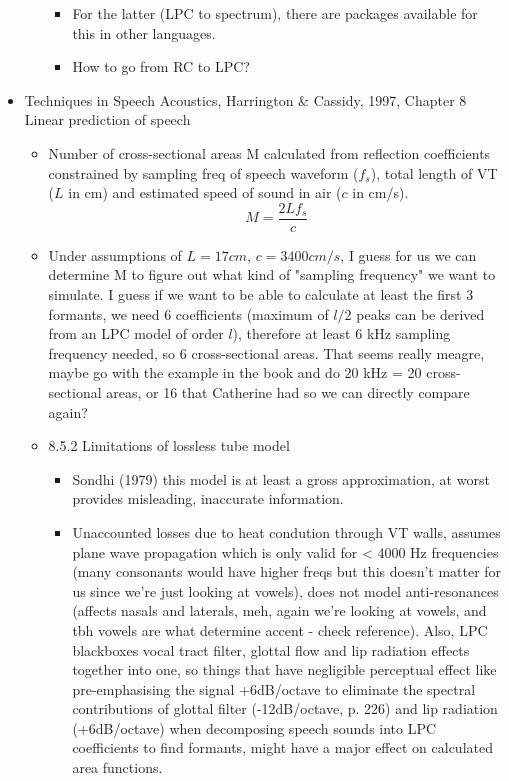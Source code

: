 \documentclass{article}
\begin{document}
\begin{itemize}
\begin{itemize}
\begin{itemize}
            \item For the latter (LPC to spectrum), there are packages available for this in other languages.
            \item How to go from RC to LPC?
        \end{itemize}
    \end{itemize}
    \item Techniques in Speech Acoustics, Harrington \& Cassidy, 1997, Chapter 8 Linear prediction of speech
    \begin{itemize}
        \item Number of cross-sectional areas M calculated from reflection coefficients constrained by sampling freq of speech waveform ($f_s$), total length of VT ($L$ in cm) and estimated speed of sound in air ($c$ in cm/s). \begin{equation}
            M = \frac{2Lf_s}{c}
        \end{equation}
        \item Under assumptions of $L = 17cm$, $c = 3400 cm/s$, I guess for us we can determine M to figure out what kind of "sampling frequency" we want to simulate. I guess if we want to be able to calculate at least the first 3 formants, we need 6 coefficients (maximum of $l/2$ peaks can be derived from an LPC model of order $l$), therefore at least 6 kHz sampling frequency needed, so 6 cross-sectional areas. That seems really meagre, maybe go with the example in the book and do 20 kHz = 20 cross-sectional areas, or 16 that Catherine had so we can directly compare again?
        \item 8.5.2 Limitations of lossless tube model
        \begin{itemize}
            \item Sondhi (1979) this model is at least a gross approximation, at worst provides misleading, inaccurate information.
            \item Unaccounted losses due to heat condution through VT walls, assumes plane wave propagation which is only valid for < 4000 Hz frequencies (many consonants would have higher freqs but this doesn't matter for us since we're just looking at vowels), does not model anti-resonances (affects nasals and laterals, meh, again we're looking at vowels, and tbh vowels are what determine accent - check reference). Also, LPC blackboxes vocal tract filter, glottal flow and lip radiation effects together into one, so things that have negligible perceptual effect like pre-emphasising the signal +6dB/octave to eliminate the spectral contributions of glottal filter (-12dB/octave, p. 226) and lip radiation (+6dB/octave) when decomposing speech sounds into LPC coefficients to find formants, might have a major effect on calculated area functions.

\end{itemize}
\end{itemize}
\end{itemize}
\end{document}
